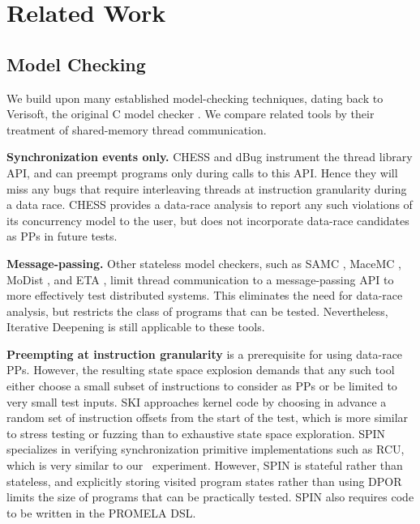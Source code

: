 \section{Related Work}
\label{sec:related}

\subsection{Model Checking}

We build upon many established model-checking techniques, dating back
to Verisoft, the original C model checker \cite{verisoft}.
We compare related tools by their treatment of shared-memory thread communication.

{\bf Synchronization events only.} CHESS \cite{chess} and dBug \cite{dbug-ssv} instrument the thread library API, and can preempt programs only during calls to this API.
Hence they will miss any bugs that require interleaving threads at instruction granularity during a data race. CHESS provides a data-race analysis to report any such violations of its concurrency model to the user, but does not incorporate data-race candidates as PPs in future tests.

{\bf Message-passing.} Other stateless model checkers, such as SAMC \cite{samc}, MaceMC \cite{macemc}, MoDist \cite{modist}, and ETA \cite{dbug-retreat}, limit thread communication to a message-passing API to more effectively test distributed systems.
This eliminates the need for data-race analysis, but restricts the class of programs that can be tested.
Nevertheless, Iterative Deepening is still applicable to these tools.

{\bf Preempting at instruction granularity} is a prerequisite for using data-race PPs.
However, the resulting state space explosion demands that any such tool either
choose a small subset of instructions to consider as PPs
or be limited to very small test inputs.
SKI \cite{ski} approaches kernel code by choosing in advance a random set of instruction offsets from the start of the test,
which is more similar to stress testing or fuzzing than to exhaustive state space exploration.
SPIN \cite{spin} specializes in verifying synchronization primitive implementations such as RCU, which is very similar to our \mxtest~experiment.
However, SPIN is stateful rather than stateless, and explicitly storing visited program states rather than using DPOR limits the size of programs that can be practically tested.
SPIN also requires code to be written in the PROMELA DSL.

